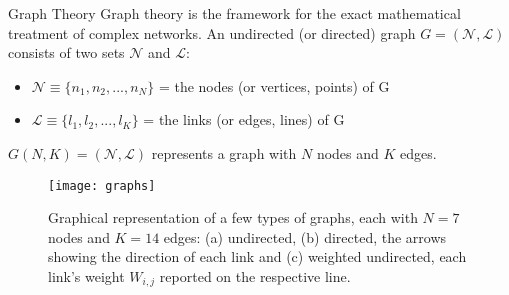 \begin{frame}{Graph Theory}
Graph theory is the framework for the exact mathematical treatment of complex networks. An undirected (or directed) graph $G=(\mathcal{N},\mathcal{L})$ consists of two sets $\mathcal{N}$ and $\mathcal{L}$:
\begin{itemize}
	\item $\mathcal{N} \equiv \{ n_1,n_2,...,n_N \}$ = the nodes (or vertices, points) of G
	\item $\mathcal{L} \equiv \{ l_1,l_2,...,l_K \}$ = the links (or edges, lines) of G 
\end{itemize}
$G(N,K) = (\mathcal{N},\mathcal{L})$ represents a graph with $N$ nodes and $K$ edges.\par 

\begin{figure}[!h]
  \centering
  \texttt{[image: graphs]}
  \caption{Graphical representation of a few types of graphs, each with $N=7$ nodes and $K=14$ edges: (a) undirected, (b) directed, the arrows showing the direction of each link and (c) weighted undirected, each link's weight $W_{i,j}$ reported on the respective line.}
  \label{fig:graphs}
\end{figure}

\end{frame}

